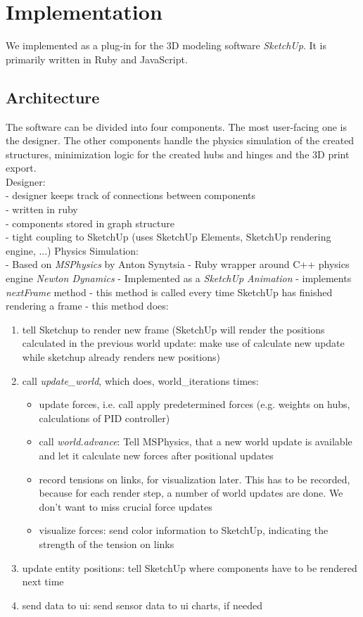 \chapter{Implementation}\label{ch:implementation}
We implemented \trussFabName{} as a plug-in for the 3D modeling software \textit{SketchUp}. It is primarily written in Ruby and JavaScript.
\section{Architecture}
The software can be divided into four components. The most user-facing one is the designer. The other components handle the physics simulation of the created structures, minimization logic for the created hubs and hinges and the 3D print export.\\
Designer:\\
- designer keeps track of connections between components\\
- written in ruby\\
- components stored in graph structure \\
- tight coupling to SketchUp (uses SketchUp Elements, SketchUp rendering engine, ...)
Physics Simulation:\\
- Based on \textit{MSPhysics} by Anton Synytsia
- Ruby wrapper around C++ physics engine \textit{Newton Dynamics}
- Implemented as a \textit{SketchUp Animation}
- implements \textit{nextFrame} method
- this method is called every time SketchUp has finished rendering a frame
- this method does:
\begin{enumerate}
    \item tell Sketchup to render new frame (SketchUp will render the positions calculated in the previous world update: make use of calculate new update while sketchup already renders new positions)
    \item call \textit{update\_world}, which does, world\_iterations times:
    \begin{itemize}
        \item update forces, i.e. call apply predetermined forces (e.g. weights on hubs, calculations of PID controller)
        \item call \textit{world.advance}: Tell MSPhysics, that a new world update is available and let it calculate new forces after positional updates
        \item record tensions on links, for visualization later. This has to be recorded, because for each render step, a number of world updates are done. We don't want to miss crucial force updates
        \item visualize forces: send color information to SketchUp, indicating the strength of the tension on links
    \end{itemize}
    \item update entity positions: tell SketchUp where components have to be rendered next time
    \item send data to ui: send sensor data to ui charts, if needed
\end{enumerate}
